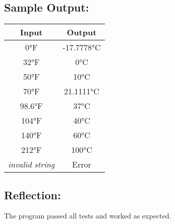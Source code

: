 \documentclass[main.tex]{subfiles}
\begin{document}
        \subsection*{Sample Output:}
            \begin{center}
                \begin{tabular}{c c}
                    \hline
                    \textbf{Input} & \textbf{Output} \\
                    \hline
                    0°F & -17.7778°C \\
                    32°F & 0°C \\
                    50°F & 10°C \\
                    70°F & 21.1111°C \\
                    98.6°F & 37°C \\
                    104°F & 40°C \\
                    140°F & 60°C \\
                    212°F & 100°C \\
                    \textit{invalid string} & Error \\
                \end{tabular}
            \end{center}

        \subsection*{Reflection:}
            The program passed all tests and worked as expected.
\end{document}

